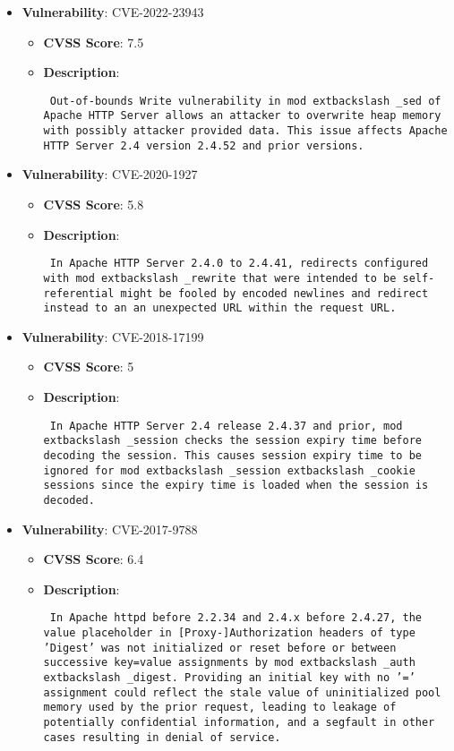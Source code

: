 \documentclass{article}
\begin{document}
\begin{itemize}
        \item \textbf{Vulnerability}: CVE-2022-23943
        \begin{itemize}
            \item \textbf{CVSS Score}:  7.5 
            \item \textbf{Description}: \parbox{\linewidth}{\texttt{ Out-of-bounds Write vulnerability in mod	extbackslash _sed of Apache HTTP Server allows an attacker to overwrite heap memory with possibly attacker provided data. This issue affects Apache HTTP Server 2.4 version 2.4.52 and prior versions. }}
        \end{itemize}
    
        \item \textbf{Vulnerability}: CVE-2020-1927
        \begin{itemize}
            \item \textbf{CVSS Score}:  5.8 
            \item \textbf{Description}: \parbox{\linewidth}{\texttt{ In Apache HTTP Server 2.4.0 to 2.4.41, redirects configured with mod	extbackslash _rewrite that were intended to be self-referential might be fooled by encoded newlines and redirect instead to an an unexpected URL within the request URL. }}
        \end{itemize}
    
        \item \textbf{Vulnerability}: CVE-2018-17199
        \begin{itemize}
            \item \textbf{CVSS Score}:  5 
            \item \textbf{Description}: \parbox{\linewidth}{\texttt{ In Apache HTTP Server 2.4 release 2.4.37 and prior, mod	extbackslash _session checks the session expiry time before decoding the session. This causes session expiry time to be ignored for mod	extbackslash _session	extbackslash _cookie sessions since the expiry time is loaded when the session is decoded. }}
        \end{itemize}
    
        \item \textbf{Vulnerability}: CVE-2017-9788
        \begin{itemize}
            \item \textbf{CVSS Score}:  6.4 
            \item \textbf{Description}: \parbox{\linewidth}{\texttt{ In Apache httpd before 2.2.34 and 2.4.x before 2.4.27, the value placeholder in [Proxy-]Authorization headers of type 'Digest' was not initialized or reset before or between successive key=value assignments by mod	extbackslash _auth	extbackslash _digest. Providing an initial key with no '=' assignment could reflect the stale value of uninitialized pool memory used by the prior request, leading to leakage of potentially confidential information, and a segfault in other cases resulting in denial of service. }}
        \end{itemize}
    

\end{itemize}
\end{document}
